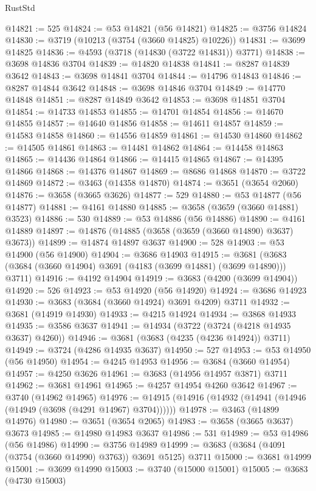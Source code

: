 \begin{lexlean}{RustStd}
\begin{coremodule}
@14821 := 525
@14824 := @53 @14821 (@56 @14821)
@14825 := @3756 @14824
@14830 := @3719 (@10213 (@3754 (@3660 @14825) @10226))
@14831 := @3699 @14825
@14836 := @4593 (@3718 (@14830 (@3722 @14831)) @3771)
@14838 := @3698 @14836 @3704
@14839 := @14820 @14838
@14841 := @8287 @14839 @3642
@14843 := @3698 @14841 @3704
@14844 := @14796 @14843
@14846 := @8287 @14844 @3642
@14848 := @3698 @14846 @3704
@14849 := @14770 @14848
@14851 := @8287 @14849 @3642
@14853 := @3698 @14851 @3704
@14854 := @14733 @14853
@14855 := @14701 @14854
@14856 := @14670 @14855
@14857 := @14640 @14856
@14858 := @14611 @14857
@14859 := @14583 @14858
@14860 := @14556 @14859
@14861 := @14530 @14860
@14862 := @14505 @14861
@14863 := @14481 @14862
@14864 := @14458 @14863
@14865 := @14436 @14864
@14866 := @14415 @14865
@14867 := @14395 @14866
@14868 := @14376 @14867
@14869 := @8686 @14868
@14870 := @3722 @14869
@14872 := @3463 (@14358 @14870)
@14874 := @3651 (@3654 @2060)
@14876 := @3658 (@3665 @3626)
@14877 := 529
@14880 := @53 @14877 (@56 @14877)
@14881 := @4161 @14880
@14885 := @3658 (@3659 (@3660 @14881) @3523)
@14886 := 530
@14889 := @53 @14886 (@56 @14886)
@14890 := @4161 @14889
@14897 := @14876 (@14885 (@3658 (@3659 (@3660 @14890) @3637) @3673))
@14899 := @14874 @14897 @3637
@14900 := 528
@14903 := @53 @14900 (@56 @14900)
@14904 := @3686 @14903
@14915 := @3681 (@3683 (@3684 (@3660 @14904) @3691 (@4183 (@3699 @14881) (@3699 @14890))) @3711)
@14916 := @4192 @14904
@14919 := @3683 (@4200 (@3699 @14904))
@14920 := 526
@14923 := @53 @14920 (@56 @14920)
@14924 := @3686 @14923
@14930 := @3683 (@3684 (@3660 @14924) @3691 @4209) @3711
@14932 := @3681 (@14919 @14930)
@14933 := @4215 @14924
@14934 := @3868 @14933
@14935 := @3586 @3637
@14941 := @14934 (@3722 (@3724 (@4218 @14935 @3637) @4260))
@14946 := @3681 (@3683 (@4235 (@4236 @14924)) @3711)
@14949 := @3724 (@4286 @14935 @3637)
@14950 := 527
@14953 := @53 @14950 (@56 @14950)
@14954 := @4245 @14953
@14956 := @3684 (@3660 @14954)
@14957 := @4250 @3626
@14961 := @3683 (@14956 @14957 @3871) @3711
@14962 := @3681 @14961
@14965 := @4257 @14954 @4260 @3642
@14967 := @3740 (@14962 @14965)
@14976 := @14915 (@14916 (@14932 (@14941 (@14946 (@14949 (@3698 (@4291 @14967) @3704))))))
@14978 := @3463 (@14899 @14976)
@14980 := @3651 (@3654 @2065)
@14983 := @3658 (@3665 @3637) @3673
@14985 := @14980 @14983 @3637
@14986 := 531
@14989 := @53 @14986 (@56 @14986)
@14990 := @3756 @14989
@14999 := @3683 (@3684 (@4091 (@3754 (@3660 @14990) @3763)) @3691 @5125) @3711
@15000 := @3681 @14999
@15001 := @3699 @14990
@15003 := @3740 (@15000 @15001)
@15005 := @3683 (@4730 @15003)

\end{coremodule}
\end{lexlean}
